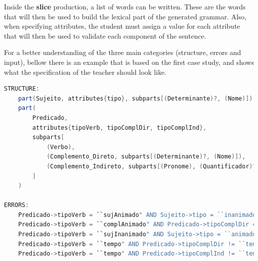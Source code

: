 Inside the \textbf{slice} production, a list of words can be written. These are the words that will then be used to build the lexical part of the generated grammar. Also, when specifying attributes, the student must assign a value for each attribute that will then be used to validate each component of the sentence.

For a better understanding of the three main categories (structure, errors and input), bellow there is an example that is based on the first case study, and shows what the specification of the teacher should look like.
\newpage

\begin{center}
\begin{minipage}{13cm}
\begin{lstlisting}[language=java, basicstyle=\tiny, label={lst:meta_struct_err}, caption=Example of a possible sentence structure]
STRUCTURE:
    part(Sujeito, attributes{tipo}, subparts[(Determinante)?, (Nome)])
    part(
        Predicado,
        attributes{tipoVerb, tipoComplDir, tipoComplInd},
        subparts[
            (Verbo),
            (Complemento_Direto, subparts[(Determinante)?, (Nome)]),
            (Complemento_Indireto, subparts[(Pronome), (Quantificador)?, (Nome)])?
        ]
    )

ERRORS:
    Predicado->tipoVerb = ``sujAnimado" AND Sujeito->tipo = ``inanimado";
    Predicado->tipoVerb = ``complAnimado" AND Predicado->tipoComplDir = ``inanimado";
    Predicado->tipoVerb = ``sujInanimado" AND Sujeito->tipo = ``animado";
    Predicado->tipoVerb = ``tempo" AND Predicado->tipoComplDir != ``tempo" AND Predicado->tipoComplDir != ``null";
    Predicado->tipoVerb = ``tempo" AND Predicado->tipoComplInd != ``tempo" AND Predicado->tipoComplInd != ``null";
\end{lstlisting}
\end{minipage}
\end{center}

%

